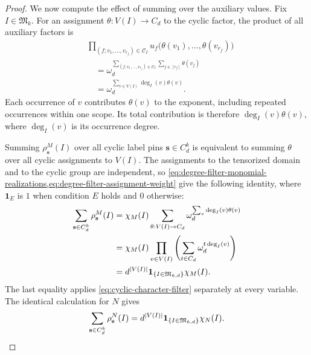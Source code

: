 \documentclass[11pt,letterpaper,onecolumn]{article}
\theoremstyle{plain}
\theoremstyle{definition}
\theoremstyle{remark}
\newcommand{\InstMonoid}[1]{\mathfrak M_{#1}}
\DeclarePairedDelimiter{\abs}{\lvert}{\rvert}
\begin{document}
\begin{proof}
We now compute the effect of summing over the auxiliary values.
Fix $I\in\InstMonoid{k}$.  For an assignment
$\theta:V(I)\to C_d$ to the cyclic factor, the product of all
auxiliary factors is
\begin{equation}
\begin{aligned}
  &\prod_{(f;v_1,\ldots,v_{r_f})\in\mathcal C_I}
    u_f\bigl(\theta(v_1),\ldots,\theta(v_{r_f})\bigr)\\
  &\quad={}
    \omega_d^{
      \sum_{(f;v_1,\ldots,v_{r_f})\in\mathcal C_I}
      \sum_{j\in[r_f]}\theta(v_j)}\\
  &\quad={}
    \omega_d^{
      \sum_{v\in V(I)}\deg_I(v)\theta(v)}.
  \label{eq:degree-filter-assignment-weight}
\end{aligned}
\end{equation}
Each occurrence of $v$ contributes $\theta(v)$ to the exponent, including
repeated occurrences within one scope.  Its total contribution is therefore
$\deg_I(v)\theta(v)$, where $\deg_I(v)$ is its occurrence degree.

Summing $\rho^M_{\mathbf s}(I)$ over all cyclic label pins
$\mathbf s\in C_d^k$ is equivalent to summing $\theta$ over all cyclic
assignments to $V(I)$.  The assignments to the tensorized domain and to the cyclic group
are independent, so
\cref{eq:degree-filter-monomial-realizations,eq:degree-filter-assignment-weight}
give the following identity, where $\mathbf 1_E$ is $1$ when condition
$E$ holds and $0$ otherwise:
\begin{equation}
\begin{aligned}
  \sum_{\mathbf s\in C_d^k}\rho^M_{\mathbf s}(I)
  &=\chi_M(I)
    \sum_{\theta:V(I)\to C_d}
      \omega_d^{\sum_v\deg_I(v)\theta(v)}\\
  &=\chi_M(I)
    \prod_{v\in V(I)}
      \left(
        \sum_{t\in C_d}
          \omega_d^{t\deg_I(v)}
      \right)\\
  &=d^{\abs{V(I)}}
    \mathbf 1_{\{I\in\mathfrak M_{k,d}\}}
    \chi_M(I).
  \label{eq:degree-filter-H}
\end{aligned}
\end{equation}
The last equality applies \eqref{eq:cyclic-character-filter} separately at
every variable.  The identical calculation for $N$ gives
\begin{equation}
  \sum_{\mathbf s\in C_d^k}\rho^N_{\mathbf s}(I)
  =d^{\abs{V(I)}}
    \mathbf 1_{\{I\in\mathfrak M_{k,d}\}}
    \chi_N(I).
  \label{eq:degree-filter-G}
\end{equation}


\end{proof}
\end{document}
